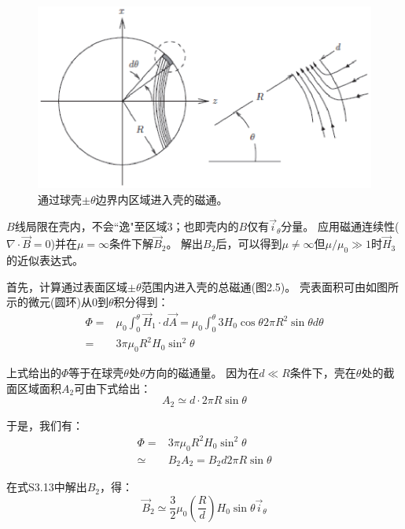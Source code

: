 \begin{figure}[htbp]
	\centering
	\includegraphics[scale=0.8]{chpt2/figs/fig2.5.eps}
	\caption{通过球壳$\pm \theta$边界内区域进入壳的磁通。}
\end{figure}

$B$线局限在壳内，不会``逸"至区域3；也即壳内的$B$仅有$\vec{i}_\theta$分量。
应用磁通连续性($\nabla \cdot \vec{B}=0$)并在$\mu=\infty$条件下解$\vec{B}_2$。
解出$B_2$后，可以得到$\mu \neq \infty$但$\mu/\mu_0 \gg 1$时$\vec{H}_3$的近似表达式。

首先，计算通过表面区域$\pm \theta$范围内进入壳的总磁通(图2.5)。
壳表面积可由如图所示的微元(圆环)从$0$到$\theta$积分得到：
\begin{align}
\Phi=&\mu_0\int_{0}^{\theta} \vec{H}_1 \cdot d\vec{A}=\mu_0\int_{0}^{\theta} 3H_0\cos\theta 2\pi R^2 \sin\theta d\theta\nonumber\\
=&3\pi\mu_0 R^2 H_0 \sin^2 \theta\nonumber \tag{S3.11}
\end{align}

上式给出的$\Phi$等于在球壳$\theta$处$\theta$方向的磁通量。
因为在$d\ll R$条件下，壳在$\theta$处的截面区域面积$A_2$可由下式给出：
\begin{equation*}
A_2\simeq d\cdot 2\pi R\sin\theta \tag{S3.12}
\end{equation*}

于是，我们有：
\begin{align}
\Phi=&3\pi\mu_0 R^2 H_0 \sin^2 \theta\nonumber\\
\simeq& B_2 A_2=B_2 d 2 \pi R \sin\theta \tag{S3.13}
\end{align}

在式S3.13中解出$B_2$，得：
\begin{equation*}
\vec{B}_2\simeq \frac{3}{2}\mu_0 \left(\frac{R}{d}\right) H_0\sin\theta\vec{i}_\theta \tag{S3.14}
\end{equation*}

